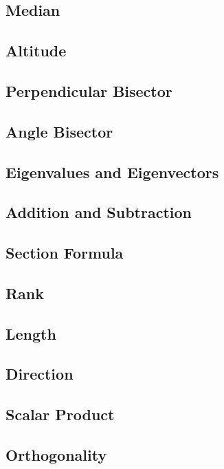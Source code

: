 \documentclass[journal]{IEEEtran}
\begin{document}
\subsection{Median}

\newpage
\subsection{Altitude}

\newpage
\subsection{Perpendicular Bisector}

\newpage
\subsection{Angle Bisector}

\newpage
\subsection{Eigenvalues and Eigenvectors}

\newpage
\subsection{Addition and Subtraction}

\newpage
\subsection{Section Formula}

\subsection{Rank}

\subsection{Length}

%
\newpage
\subsection{Direction}

\newpage
\subsection{Scalar Product}

\newpage
\subsection{Orthogonality}

\newpage
\end{document}
